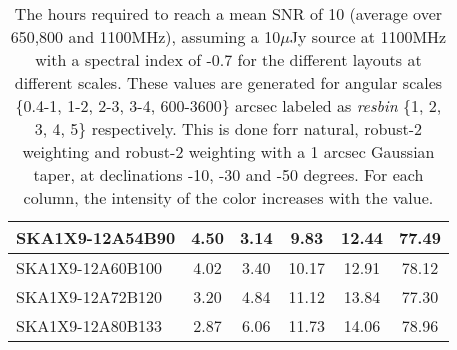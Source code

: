 \begin{table}[H]
{{\begin{tabular}{|lccccc|}
SKA1X9-12A54B90 & 4.50 \cellcolor{blue!58.51} & 3.14 \cellcolor{red!18.00} & 9.83 \cellcolor{green!18.44} & 12.44 \cellcolor{orange!36.04} & 77.49 \cellcolor{purple!52.82}\\ \hline 
SKA1X9-12A60B100 & 4.02 \cellcolor{blue!46.58} & 3.40 \cellcolor{red!20.74} & 10.17 \cellcolor{green!25.87} & 12.91 \cellcolor{orange!42.99} & 78.12 \cellcolor{purple!55.90}\\ \hline 
SKA1X9-12A72B120 & 3.20 \cellcolor{blue!26.20} & 4.84 \cellcolor{red!35.94} & 11.12 \cellcolor{green!46.66} & 13.84 \cellcolor{orange!56.75} & 77.30 \cellcolor{purple!51.89}\\ \hline 
SKA1X9-12A80B133 & 2.87 \cellcolor{blue!18.00} & 6.06 \cellcolor{red!48.81} & 11.73 \cellcolor{green!60.00} & 14.06 \cellcolor{orange!60.00} & 78.96 \cellcolor{purple!60.00}\\ \hline 
\end{tabular}}
\vspace{0.000000cm}
\hspace{1cm} 
\vspace{0.000000cm}
\hspace{1cm} 

\vspace{.25cm}
\caption{The hours required to reach a mean SNR of 10 (average over 650,800 and 1100MHz), assuming a 10$\mu$Jy source at 1100MHz with a spectral index of -0.7 for the different layouts at different scales. These values are generated for angular scales \{0.4-1, 1-2, 2-3, 3-4, 600-3600\} arcsec labeled as {\it resbin} \{1, 2, 3, 4, 5\} respectively. This is done forr natural, robust-2 weighting and robust-2 weighting with a 1 arcsec Gaussian taper, at declinations -10, -30 and -50 degrees. For each column, the intensity of the color increases with the value.}\label{tab:hours}}
 \end{table}
